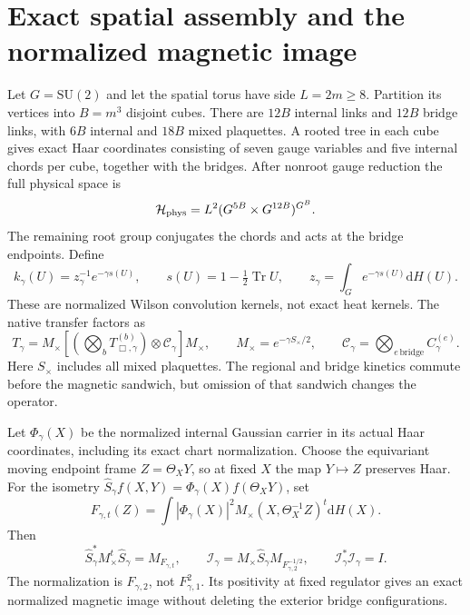 \documentclass[11pt,oneside,openany]{book}
\theoremstyle{definition}
\theoremstyle{remark}
\newcommand{\dd}{\mathrm d}
\newcommand{\Tr}{\operatorname{Tr}}
\newcommand{\SU}{\mathrm{SU}}
\begin{document}
\section{Exact spatial assembly and the normalized magnetic image}
\label{sec:native-assembly}
Let $G=\SU(2)$ and let the spatial torus have side $L=2m\ge8$.
Partition its vertices into $B=m^3$ disjoint cubes. There are $12B$
internal links and $12B$ bridge links, with $6B$ internal and $18B$
mixed plaquettes. A rooted tree in each cube gives exact Haar
coordinates consisting of seven gauge variables and five internal
chords per cube, together with the bridges. After nonroot gauge
reduction the full physical space is
\begin{equation}
 \mathcal H_{\rm phys}
       =L^2(G^{5B}\times G^{12B})^{G^B}.
 \label{eq:native-physical-space}
\end{equation}
The remaining root group conjugates the chords and acts at the bridge
endpoints. Define
\begin{equation}
 k_\gamma(U)=z_\gamma^{-1}e^{-\gamma s(U)},\qquad
 s(U)=1-\tfrac12\Tr U,\qquad
 z_\gamma=\int_Ge^{-\gamma s(U)}\dd H(U).
 \label{eq:native-Wilson-kernel}
\end{equation}
These are normalized Wilson convolution kernels, not exact heat
kernels. The native transfer factors as
\begin{equation}
 T_\gamma=M_\times
 \left[\left(\bigotimes_b T_{\Box,\gamma}^{(b)}\right)
                      \otimes\mathcal C_\gamma\right]M_\times,
 \qquad
 M_\times=e^{-\gamma S_\times/2},\qquad
 \mathcal C_\gamma=\bigotimes_{e\,\mathrm{bridge}}C_\gamma^{(e)}.
 \label{eq:native-assembly}
\end{equation}
Here $S_\times$ includes all mixed plaquettes. The regional and bridge
kinetics commute before the magnetic sandwich, but omission of that
sandwich changes the operator.

Let $\Phi_\gamma(X)$ be the normalized internal Gaussian carrier in
its actual Haar coordinates, including its exact chart normalization.
Choose the equivariant moving endpoint frame
$Z=\Theta_XY$, so at fixed $X$ the map $Y\mapsto Z$ preserves Haar.
For the isometry
$\widehat S_\gamma f(X,Y)=\Phi_\gamma(X)f(\Theta_XY)$, set
\begin{equation}
 F_{\gamma,t}(Z)=\int|\Phi_\gamma(X)|^2
            M_\times(X,\Theta_X^{-1}Z)^t\dd H(X).
 \label{eq:native-magnetic-Gram}
\end{equation}
Then
\[
 \widehat S_\gamma^*M_\times^t\widehat S_\gamma=M_{F_{\gamma,t}},
 \qquad
 \mathcal I_\gamma=M_\times\widehat S_\gamma
                                      M_{F_{\gamma,2}^{-1/2}},
 \qquad \mathcal I_\gamma^*\mathcal I_\gamma=I.
\]
The normalization is $F_{\gamma,2}$, not $F_{\gamma,1}^2$.
Its positivity at fixed regulator gives an exact normalized magnetic
image without deleting the exterior bridge configurations.
\end{document}

